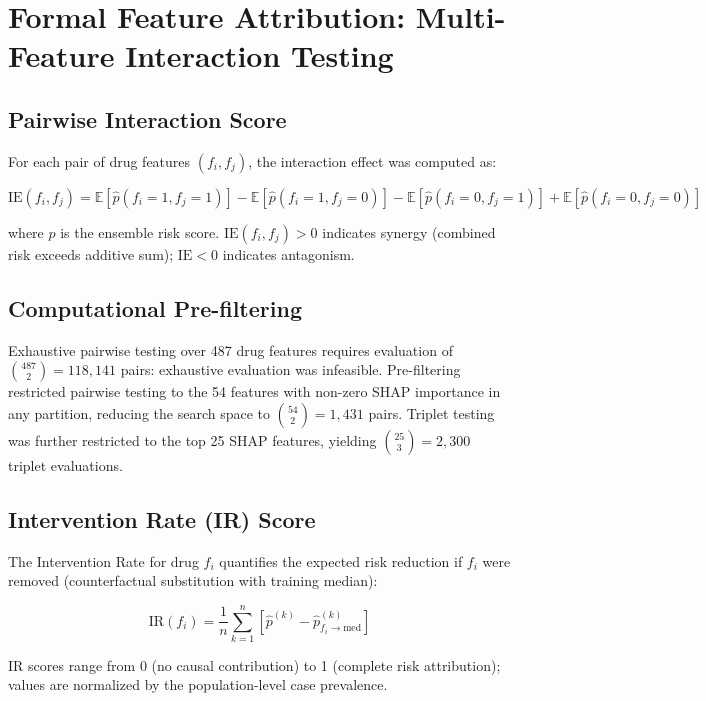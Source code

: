 \documentclass[
  12pt,
]{book}
\begin{document}
\section{Formal Feature Attribution: Multi-Feature Interaction
Testing}\label{sec-ffa}

\subsection{Pairwise Interaction
Score}\label{pairwise-interaction-score}

For each pair of drug features \((f_i, f_j)\), the interaction effect
was computed as:

\[\text{IE}(f_i, f_j) = \mathbb{E}[\hat{p}(f_i=1, f_j=1)]
  - \mathbb{E}[\hat{p}(f_i=1, f_j=0)]
  - \mathbb{E}[\hat{p}(f_i=0, f_j=1)]
  + \mathbb{E}[\hat{p}(f_i=0, f_j=0)]\]

where \(\hat{p}\) is the ensemble risk score.
\(\text{IE}(f_i, f_j) > 0\) indicates synergy (combined risk exceeds
additive sum); \(\text{IE} < 0\) indicates antagonism.

\subsection{Computational
Pre-filtering}\label{computational-pre-filtering}

Exhaustive pairwise testing over 487 drug features requires evaluation
of \(\binom{487}{2} = 118{,}141\) pairs: exhaustive evaluation was
infeasible. Pre-filtering restricted pairwise testing to the 54 features
with non-zero SHAP importance in any partition, reducing the search
space to \(\binom{54}{2} = 1{,}431\) pairs. Triplet testing was further
restricted to the top 25 SHAP features, yielding
\(\binom{25}{3} = 2{,}300\) triplet evaluations.

\subsection{Intervention Rate (IR)
Score}\label{intervention-rate-ir-score}

The Intervention Rate for drug \(f_i\) quantifies the expected risk
reduction if \(f_i\) were removed (counterfactual substitution with
training median):

\[\text{IR}(f_i) = \frac{1}{n} \sum_{k=1}^{n}
  \left[\hat{p}^{(k)} - \hat{p}^{(k)}_{f_i \to \text{med}}\right]\]

IR scores range from 0 (no causal contribution) to 1 (complete risk
attribution); values are normalized by the population-level case
prevalence.
\end{document}
